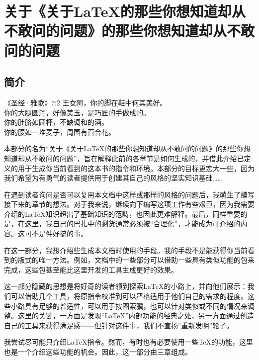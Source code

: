\part{关于《关于\LaTeX 的那些你想知道却从不敢问的问题》的那些你想知道却从不敢问的问题}

\fancyhead[LE]{\bfseries\thepage}
\fancyhead[RO]{\bfseries\thepage}

\chapter*{简介}

\begin{epigraphe}{《圣经·雅歌》7:2}
    王女阿，你的脚在鞋中何其美好。\\你的大腿圆润，好像美玉，是巧匠的手做成的。\\你的肚脐如圆杯，不缺调和的酒。\\你的腰如一堆麦子，周围有百合花。
\end{epigraphe}

本部分的名为``关于《关于\LaTeX 的那些你想知道却从不敢问的问题》的那些你想知道却从不敢问的问题''，旨在解释此前的各章节是如何生成的，并借此介绍已定义的用于生成你当前看到的这本书的指令和环境。本部分的目标更宏大一些，因为我们希望为有勇气的读者提供用于创建其自己的风格的坚实知识基础……

在遇到读者询问是否可以复用本文档中这样或那样的风格的问题后，我萌生了编写接下来的章节的想法。对于我来说，继续向下编写这项工作有些艰巨，因为我需要介绍的\LaTeX 知识超出了基础知识的范畴，也因此更难解释。最后，同样重要的是，在这里，我自己的巴扎中的剩货通常必须被``合理化''，才能成为可介绍的内容。这可不是件好搞的事。

在这一部分，我想介绍些生成本文档时使用的手段。我的手段不是能获得你当前看到的版式的唯一方法。例如，文档中的一些部分可以借助一些具有类似功能的包来完成，这些包甚至能比这里开发的工具生成更好的效果。

这一部分隐藏的思想是将好奇的读者领到探索\LaTeX 的小路上，并向他们展示：我们可以借助几个工具，将原指令校准到可以严格适用于他们自己的需求的程度。这些小路具有足够的普适性，可以用于按图索骥，也可以针对类似或不同的情况来调整。这里的关键，一方面是发现``\LaTeX ''内部功能的经典之处，另一方面通过创造自己的工具来获得满足感——但针对这件事，我们不宣扬``重新发明''轮子。

我尝试尽可能只介绍\LaTeX 指令。然而，有时也有必要使用一些\TeX 的功能，这里也是一个介绍这些功能的机会。因此，这一部分由三章组成。

